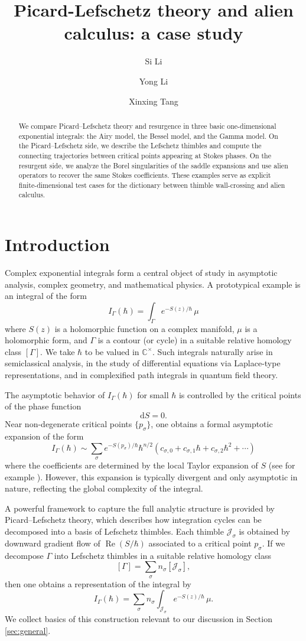 \documentclass[11pt]{amsart}
\title[Lefschetz Thimbles and Resurgence]{Picard-Lefschetz theory and alien calculus: a case study}
\author[Si Li]{Si Li}
\author[Yong Li]{Yong Li}
\author[Xinxing Tang]{Xinxing Tang}
\date{}
\theoremstyle{plain}
\newcommand{\C}{\mathbb C}
\newcommand{\dd}{\mathrm d}
\newcommand{\re}{\operatorname{Re}}
\newcommand{\J}{\mathcal J}
\begin{document}
\begin{abstract}
We compare Picard--Lefschetz theory and resurgence in three basic
one-dimensional exponential integrals: the Airy model, the Bessel
model, and the Gamma model.  On the Picard--Lefschetz side,
we describe the Lefschetz thimbles and compute the  connecting
trajectories between critical points appearing at Stokes phases.  On the resurgent side, we analyze
the Borel singularities of the saddle expansions and use alien operators to
recover the same Stokes coefficients.  These examples serve as explicit
finite-dimensional test cases for the dictionary between thimble
wall-crossing and alien calculus.
\end{abstract}
\maketitle
\tableofcontents

\section{Introduction}
Complex exponential integrals form a central object of study in asymptotic analysis, complex geometry, and mathematical physics. A prototypical example is an integral of the form
\begin{equation*}
I_\Gamma(\hbar)=\int_\Gamma e^{-S(z)/\hbar}\,\mu
\end{equation*}
where $S(z)$ is a holomorphic function on a complex manifold, $\mu$ is a holomorphic form, and $\Gamma$ is a contour (or cycle) in a suitable relative homology class $[\Gamma]$. We take $\hbar$ to be valued in $\C^\times$.  Such integrals naturally arise in semiclassical analysis, in the study of differential equations via Laplace-type representations, and in complexified path integrals in quantum field theory.

The asymptotic behavior of $I_\Gamma(\hbar)$ for small $\hbar$ is controlled by the critical points of the phase function
$$
\dd S=0.
$$
Near non-degenerate critical points $\{p_\sigma\}$, one obtains a formal asymptotic expansion of the form
$$
I_\Gamma(\hbar)\sim \sum_{\sigma}e^{-S(p_\sigma)/\hbar}\hbar^{n/2}\left(c_{\sigma,0}+c_{\sigma,1}\hbar+c_{\sigma,2}\hbar^2+\cdots\right)
$$
where the coefficients are determined by the local Taylor expansion of $S$ (see for example \cite{AGV2,Pham1983}). However, this expansion is typically divergent and only asymptotic in nature, reflecting the global complexity of the integral.

A powerful framework to capture the full analytic structure is provided by Picard–Lefschetz theory, which describes how integration cycles can be decomposed into a basis of Lefschetz thimbles. Each thimble $\J_\sigma$ is obtained by downward gradient flow of $\re(S/\hbar)$ associated to a critical point $p_\sigma$. If we decompose $\Gamma$ into Lefschetz thimbles in a suitable relative homology class
$$
[\Gamma]=\sum_\sigma n_\sigma [\J_\sigma],
$$
then one obtains a representation of the integral by
$$
I_\Gamma(\hbar)=\sum_{\sigma}n_\sigma\int_{\J_\sigma} e^{-S(z)/\hbar}\,\mu.
$$
We collect basics of this construction relevant to our discussion in Section \ref{sec:general}.
\end{document}
